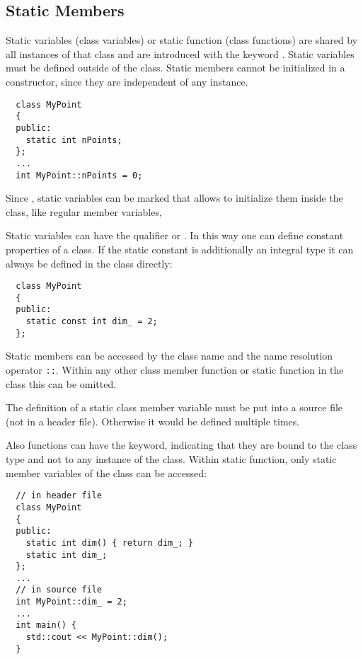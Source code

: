 \subsection{Static Members}
Static variables (class variables) or static function (class functions) are shared by all instances of that class and are introduced with the keyword .
Static variables must be defined outside of the class. Static members cannot be initialized in a constructor, since they are independent of any instance.
%
\begin{verbatim}
  class MyPoint
  {
  public:
    static int nPoints;
  };
  ...
  int MyPoint::nPoints = 0;
\end{verbatim}

Since \marginpar{[\cxx{17}]}, static variables can be marked  that allows to initialize them inside the class, like regular member
variables, \eg {}

Static variables can have the qualifier  or . In this way one can define constant properties of a class. If the static
constant is additionally an integral type it can always be defined in the class directly:
%
\begin{verbatim}
  class MyPoint
  {
  public:
    static const int dim_ = 2;
  };
\end{verbatim}

Static members can be accessed by the class name and the name resolution operator \texttt{::}. Within any other class member function or static function in the
class this can be omitted.

\begin{rem}
  The definition of a static class member variable must be put into a source file (not in a header file). Otherwise it would be defined multiple times.
\end{rem}

Also functions can have the  keyword, indicating that they are bound to the class type and not to any instance of the class. Within static
function, only static member variables of the class can be accessed:
%
\begin{verbatim}
  // in header file
  class MyPoint
  {
  public:
    static int dim() { return dim_; }
    static int dim_;
  };
  ...
  // in source file
  int MyPoint::dim_ = 2;
  ...
  int main() {
    std::cout << MyPoint::dim();
  }
\end{verbatim}


